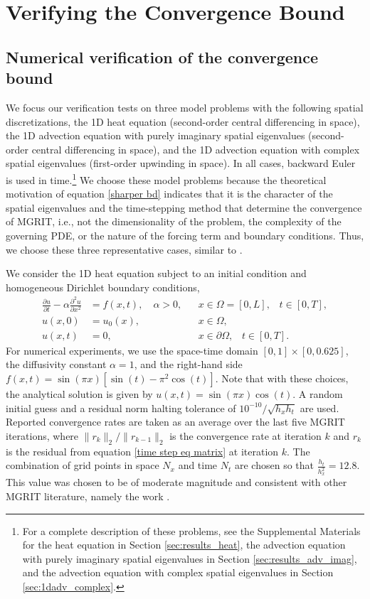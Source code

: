 \documentclass[VANCOUVER,STIX1COL]{WileyNJD-v2}
\begin{document}
\section{Verifying the Convergence Bound}
\label{sec:verify}
\subsection{Numerical verification of the convergence bound} \label{sec: Numerial veri bound}
We focus our verification tests on three model problems with the following spatial discretizations, the 1D heat equation (second-order central differencing in space), the 1D advection equation with purely imaginary
spatial eigenvalues (second-order central differencing in space), and the 1D advection equation with complex spatial eigenvalues (first-order upwinding in space).  In all cases, backward Euler is used in time.\footnote{For a complete description of these problems, see the Supplemental Materials for the heat equation in Section \ref{sec:results_heat},  the advection equation with purely imaginary spatial eigenvalues in Section \ref{sec:results_adv_imag}, and the advection equation with complex spatial eigenvalues in Section \ref{sec:1dadv_complex}.}  We choose these model problems because the theoretical motivation of equation \eqref{sharper bd} indicates that it is the character of the spatial eigenvalues and the time-stepping method that determine the convergence of MGRIT, i.e., not the dimensionality of the problem, the complexity of the governing PDE, or the nature of the forcing term and boundary conditions.  Thus, we choose these three representative cases, similar to \cite{Do2016, HeSoNoRoFaSc2018}.

%
We consider the 1D heat equation subject to an initial condition and homogeneous Dirichlet boundary conditions,
\begin{align}
\frac{\partial u}{\partial t} - \alpha \frac{\partial^2 u}{\partial x^2} &= f(x,t), \quad\alpha > 0, && x \in \Omega = [0, L],\hspace{10pt} t \in [0, T], \nonumber \\
u(x, 0) &= u_0(x), && x \in \Omega, \\
u(x, t) &= 0, && x \in \partial \Omega, \hspace{10pt} t \in [0, T].\nonumber
\end{align} For numerical experiments, we use the space-time domain $[0, 1]\times [0, 0.625]$, the diffusivity constant $\alpha = 1$, and the right-hand side $f(x,t) = \sin(\pi x) [\sin(t) - \pi^2 \cos(t)]$. Note that with these choices, the analytical solution is given by $u(x, t) = \sin(\pi x)\cos(t)$.
A random initial guess and a residual norm halting tolerance of $ 10^{-10} / \sqrt{h_x h_t}$ are used. 
Reported convergence rates are taken as an average over the last five MGRIT
iterations, where $\| r_k\|_2 / \| r_{k-1} \|_2$ is the convergence rate at iteration $k$ and $r_k$ is the residual from equation \eqref{time step eq matrix} at iteration $k$.
The combination of grid points in space $N_x$ and time $N_t$ are chosen so that 
$\frac{h_t}{h_x^2}  = 12.8$.  This value was chosen to be of moderate magnitude and 
consistent with other MGRIT literature, namely the work \cite{Do2016}.
%
\end{document}
